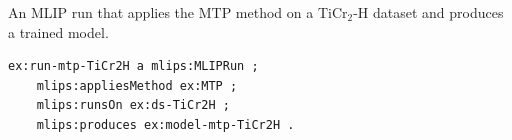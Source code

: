 An MLIP run that applies the MTP method on a TiCr$_2$-H dataset and produces a trained model.
\begin{lstlisting}[language=turtle]
ex:run-mtp-TiCr2H a mlips:MLIPRun ;
    mlips:appliesMethod ex:MTP ;
    mlips:runsOn ex:ds-TiCr2H ;
    mlips:produces ex:model-mtp-TiCr2H .
\end{lstlisting}
